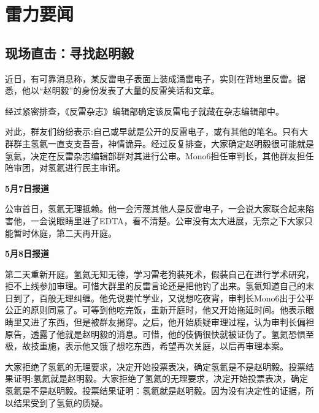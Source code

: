 \documentclass[UTF8,12pt,oneside]{ctexbook}
\begin{document}
    \tableofcontents    

    \clearpage
    
    \chapter{雷力要闻}
        
        \section{现场直击：寻找赵明毅}
        
        \large
        近日，有可靠消息称，某反雷电子表面上装成涌雷电子，实则在背地里反雷。据悉，他以“赵明毅”的身份发表了大量的反雷笑话和文章。
        
        经过紧密排查，《反雷杂志》编辑部确定该反雷电子就藏在杂志编辑部中。
        
        对此，群友们纷纷表示:自己或早就是公开的反雷电子，或有其他的笔名。只有大群群主氢氦一直支支吾吾，神情诡异。经过反复排查，大家确定赵明毅很可能就是氢氦，决定在反雷杂志编辑部群对其进行公审。Mono6担任审判长，其他群友担任陪审团，对氢氦进行民主审讯。
        
        \begin{center}
            \textbf{5月7日报道}
        \end{center}
        
        公审首日，氢氦无理抵赖。他一会污蔑其他人是反雷电子，一会说大家联合起来陷害他，一会说眼睛里进了EDTA，看不清楚。公审没有太大进展，无奈之下大家只能暂时休庭，第二天再开庭。
        
        \begin{center}
            \textbf{5月8日报道}
        \end{center}
        
        第二天重新开庭。氢氦无知无德，学习雷老狗装死术，假装自己在进行学术研究，拒不上线参加审理。可惜大群里的反雷言论还是把他钓了出来。氢氦知道自己的末日到了，百般无理纠缠。他先说要忙学业，又说想吃夜宵，审判长Mono6出于公平公正的原则同意了。可等到他吃完饭，重新开庭时，他又开始拖延时间。他表示眼睛里又进了东西，但是被群友揭穿。之后，他开始质疑审理过程，认为审判长偏袒原告，透露了他就是赵明毅的消息。可惜，他的伎俩很快就被证伪了。氢氦恐惧至极，故技重施，表示他又饿了想吃东西，希望再次关庭，以后再审理本案。
        
        大家拒绝了氢氦的无理要求，决定开始投票表决，确定氢氦是不是赵明毅。投票结果证明:氢氦就是赵明毅。大家拒绝了氢氦的无理要求，决定开始投票表决，确定氢氦是不是赵明毅。投票结果证明：氢氦就是赵明毅。因为没有决定性的证据，所以结果受到了氢氦的质疑。
\end{document}
